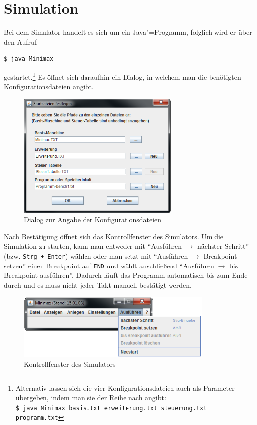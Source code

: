 \chapter{Simulation}
\label{chapter:Dokumentation-Simulation}

Bei dem Simulator handelt es sich um ein Java"=Programm, folglich wird er über den Aufruf

\texttt{\$ java Minimax}

gestartet.\footnote{Alternativ lassen sich die vier Konfigurationsdateien auch als Parameter übergeben, indem man sie der Reihe nach angibt:\\ \texttt{\$ java Minimax basis.txt erweiterung.txt steuerung.txt programm.txt}} Es öffnet sich daraufhin ein Dialog, in welchem man die benötigten Konfigurationsdateien angibt.

\begin{figure}[htb]
    \centering
    \includegraphics[width=0.7\textwidth]{dokumentation/res/minimax_load.png}
    \caption{Dialog zur Angabe der Konfigurationsdateien}
    \label{figure:Dokumentation-Simulation-Load}
\end{figure}

Nach Bestätigung öffnet sich das Kontrollfenster des Simulators. Um die Simulation zu starten, kann man entweder mit "`Ausführen $\rightarrow$ nächster Schritt"' (bzw. \texttt{Strg~+~Enter}) wählen oder man setzt mit "`Ausführen $\rightarrow$ Breakpoint setzen"' einen Breakpoint auf \texttt{END} und wählt anschließend "`Ausführen $\rightarrow$ bis Breakpoint ausführen"'. Dadurch läuft das Programm automatisch bis zum Ende durch und es muss nicht jeder Takt manuell bestätigt werden.

\begin{figure}[htb]
    \centering
    \includegraphics[width=0.85\textwidth]{dokumentation/res/minimax_run.png}
    \caption{Kontrollfenster des Simulators}
    \label{figure:Dokumentation-Simulation-Run}
\end{figure}

